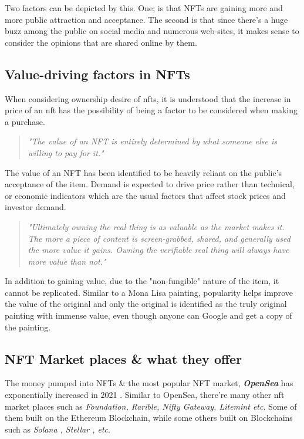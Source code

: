 Two factors can be depicted by this. One; is that NFTs are gaining more and more public attraction and acceptance. The second is that since there's a huge buzz among the public on social media and numerous web-sites, it makes sense to consider the opinions that are shared online by them.

\subsection{Value-driving factors in NFTs}

When considering ownership desire of \gls{nft}s, it is understood that the increase in price of an \gls{nft} has the possibility of being a factor to be considered when making a purchase.

\begin{quote} 
\centering 
\emph{"The value of an NFT is entirely determined by what someone else is willing to pay for it."}
\\
\raggedleft
\autocite{conti_what_2021}
\end{quote}

The value of an NFT has been identified to be heavily reliant on the public's acceptance of the item. Demand is expected to drive price rather than technical, or economic indicators which are the usual factors that affect stock prices and investor demand.

\begin{quote} 
\centering 
\emph{"Ultimately owning the real thing is as valuable as the market makes it. The more a piece of content is screen-grabbed, shared, and generally used the more value it gains. Owning the verifiable real thing will always have more value than not."}
\\
\raggedleft
\autocite{noauthor_erc-721_nodate}
\end{quote}

In addition to gaining value, due to the "non-fungible" nature of the item, it cannot be replicated. Similar to a Mona Lisa painting, popularity helps improve the value of the original and only the original is identified as the truly original painting with immense value, even though anyone can Google and get a copy of the painting.


\subsection{NFT Market places \& what they offer}
The money pumped into NFTs \& the most popular NFT market, \textbf{\textit{OpenSea}} has exponentially increased in 2021 \autocite{matney_nft_2021}.
Similar to OpenSea, there're many other \gls{nft} market places such as \textit{Foundation, Rarible, Nifty Gateway, Litemint etc}. Some of them built on the Ethereum Blockchain, while some others built on Blockchains such as \textit{Solana \autocite{community_solana_2021, staff_solana_2021}, Stellar \autocite{fred_rezeau_nfts_2021}, etc}.


